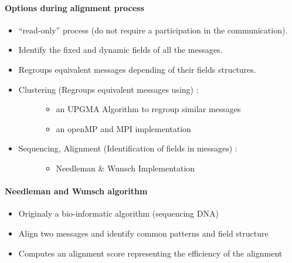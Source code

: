 \documentclass[letterpaper,10pt,english]{sphinxmanual}
\begin{document}
\paragraph{Options during alignment process}
\label{modelization/vocabular:options-during-alignment-process}\begin{itemize}
\item {} 
``read-only” process (do not require a participation in the
communication).

\item {} 
Identify the fixed and dynamic fields of all the messages.

\item {} 
Regroups equivalent messages depending of their fields structures.

\item {} \begin{description}
\item[{Clustering (Regroups equivalent messages using) :}] \leavevmode\begin{itemize}
\item {} 
an UPGMA Algorithm to regroup similar messages

\item {} 
an openMP and MPI implementation

\end{itemize}

\end{description}

\item {} \begin{description}
\item[{Sequencing, Alignment (Identification of fields in messages) :}] \leavevmode\begin{itemize}
\item {} 
Needleman \& Wunsch Implementation

\end{itemize}

\end{description}

\end{itemize}


\paragraph{Needleman and Wunsch algorithm}
\label{modelization/vocabular:needleman-and-wunsch-algorithm}\begin{itemize}
\item {} 
Originaly a bio-informatic algorithm (sequencing DNA)

\item {} 
Align two messages and identify common patterns and field structure

\item {} 
Computes an alignment score representing the efficiency of the
alignment

\end{itemize}
\end{document}
